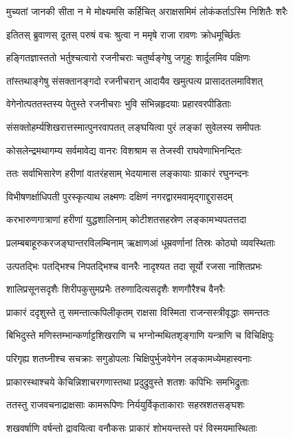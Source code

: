 \twolineshloka
{मुच्यतां जानकी सीता न मे मोक्ष्यमसि कर्हिचित्}
{अराक्षसमिमं लोकंकर्ताऽस्मि निशितैः शरैः}


\twolineshloka
{इतितस् ब्रुवाणस् दूतस् परुषं वचः}
{श्रुत्वा न ममृषे राजा रावणः क्रोधमूर्च्छितः}


\twolineshloka
{हङ्गितज्ञास्ततो भर्तुश्चत्वारो रजनीचराः}
{चतुर्ष्वङ्गेषु जगृहुः शार्दूलमिव पक्षिणः}


\twolineshloka
{तांस्तथाङ्गेषु संसक्तानङ्गदो रजनीचरान्}
{आदायैव खमुत्पत्य प्रासादतलमाविशत्}


\twolineshloka
{वेगेनोत्पततस्तस्य पेतुस्ते रजनीचराः}
{भुवि संभिन्नहृदयाः प्रहारवरपीडिताः}


\twolineshloka
{संसक्तोहर्म्यशिखरात्तस्मात्पुनरवापतत्}
{लङ्घयित्वा पुरं लङ्कां सुवेलस्य समीपतः}


\twolineshloka
{कोसलेन्द्रमथागम्य सर्वमावेद्य वानरः}
{विशश्राम स तेजस्वी राघवेणाभिनन्दितः}


\twolineshloka
{ततः सर्वाभिसारेण हरीणां वातरंहसाम्}
{भेदयामास लङ्कायाः ग्राकारं रघुनन्दनः}


\twolineshloka
{विभीषणर्क्षाधिपती पुरस्कृत्याथ लक्ष्मणः}
{दक्षिणं नगरद्वारमवामृद्गाद्दुरासदम्}


\twolineshloka
{करभारुणगात्राणां हरीणां युद्धशालिनाम्}
{कोटीशतसहस्रेण लङ्कामभ्यपतत्तदा}


\twolineshloka
{प्रलम्बबाहूरुकरजङ्घान्तरविलम्बिनाम्}
{ऋक्षाणआं धूम्रवर्णानां तिस्रः कोठ्यो व्यवस्थिताः}


\twolineshloka
{उत्पतद्भिः पतद्भिश्च निपतद्भिश्च वानरैः}
{नादृश्यत तदा सूर्यो रजसा नाशितप्रभः}


\twolineshloka
{शालिप्रसूनसदृशैः शिरीपकुसुमप्रभैः}
{तरुणादित्यसदृशैः शणगौरैश्च वैनरैः}


\twolineshloka
{प्राकारं ददृशुस्ते तु समन्तात्कपिलीकृतम्}
{राक्षसा विस्मिता राजन्सस्त्रीवृद्धाः समन्ततः}


\twolineshloka
{बिभिदुस्ते मणिस्तम्भान्कर्णाट्टशिखराणि च}
{भग्नोन्मथितशृङ्गाणि यन्त्राणि च विचिक्षिपुः}


\twolineshloka
{परिगृह्य शतघ्नीश्च सचक्राः सगुडोपलाः}
{चिक्षिपुर्भुजवेगेन लङ्कामध्येमहास्वनाः}


\twolineshloka
{प्राकारस्थाश्चये केचिन्निशाचरगणास्तथा}
{प्रदुद्रुवुस्ते शतशः कपिभिः समभिद्रुताः}


\twolineshloka
{ततस्तु राजवचनाद्राक्षसाः कामरूपिणः}
{निर्ययुर्विकृताकाराः सहस्रशतसङ्घशः}


\twolineshloka
{शखवर्षाणि वर्षन्तो द्रावयित्वा वनौकसः}
{प्राकारं शोभयन्तस्ते परं विस्मयमास्थिताः}


